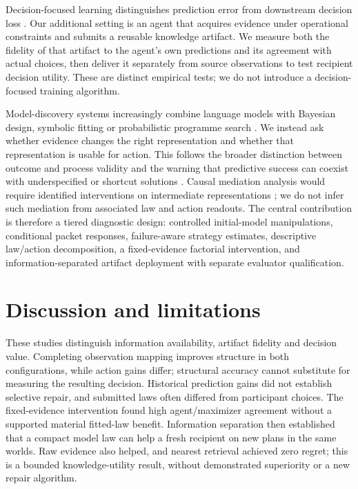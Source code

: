 \documentclass{article}
\begin{document}
Decision-focused learning distinguishes prediction error from downstream
decision loss \citep{elmachtoub2022spo, wilder2019decisionfocused}. Our
additional setting is an agent that acquires evidence under operational
constraints and submits a reusable knowledge artifact. We measure both
the fidelity of that artifact to the agent's own predictions and its
agreement with actual choices, then deliver it separately from source
observations to test recipient decision utility. These are distinct
empirical tests; we do not introduce a decision-focused training
algorithm.

Model-discovery systems increasingly combine language models with
Bayesian design, symbolic fitting or probabilistic programme search
\citep{murphy2026mda, wahl2026probabilistic, zheng2026newtonbench}. We
instead ask whether evidence changes the right representation and
whether that representation is usable for action. This follows the
broader distinction between outcome and process validity
\citep{riosgarcia2026scientifically} and the warning that predictive
success can coexist with underspecified or shortcut solutions
\citep{damour2022underspecification, geirhos2020shortcut}. Causal
mediation analysis would require identified interventions on
intermediate representations \citep{imai2010mediation}; we do not infer
such mediation from associated law and action readouts. The central
contribution is therefore a tiered diagnostic design: controlled
initial-model manipulations, conditional packet responses, failure-aware
strategy estimates, descriptive law/action decomposition, a
fixed-evidence factorial intervention, and information-separated
artifact deployment with separate evaluator qualification.

\section{Discussion and limitations}\label{discussion-and-limitations}

These studies distinguish information availability, artifact fidelity
and decision value. Completing observation mapping improves structure in
both configurations, while action gains differ; structural accuracy
cannot substitute for measuring the resulting decision. Historical
prediction gains did not establish selective repair, and submitted laws
often differed from participant choices. The fixed-evidence intervention
found high agent/maximizer agreement without a supported material
fitted-law benefit. Information separation then established that a
compact model law can help a fresh recipient on new plans in the same
worlds. Raw evidence also helped, and nearest retrieval achieved zero
regret; this is a bounded knowledge-utility result, without demonstrated
superiority or a new repair algorithm.
\end{document}
